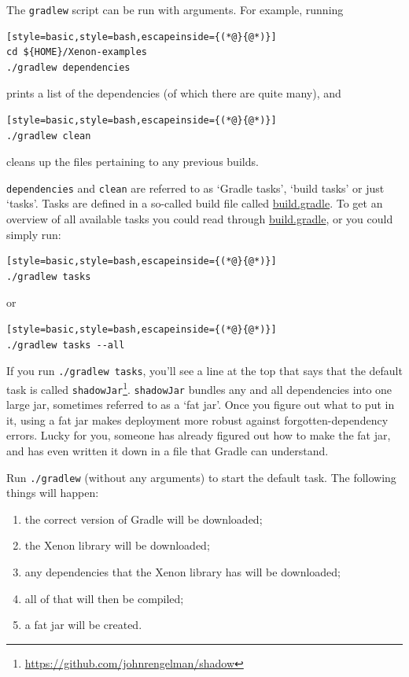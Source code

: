 \documentclass[12pt, a4paper, twoside, openany, titlepage]{book}
\begin{document}
The \texttt{gradlew} script can be run with arguments. For example, running
\begin{lstlisting}[style=basic,style=bash,escapeinside={(*@}{@*)}]
cd ${HOME}/Xenon-examples
./gradlew dependencies
\end{lstlisting} %
prints a list of the dependencies (of which there are quite many), and

\begin{lstlisting}[style=basic,style=bash,escapeinside={(*@}{@*)}]
./gradlew clean
\end{lstlisting} %
cleans up the files pertaining to any previous builds.

\texttt{dependencies} and \texttt{clean} are referred to as `Gradle tasks', `build tasks' or just `tasks'. Tasks are defined in a so-called build file called \url{build.gradle}. To get an overview of all available tasks you could read through \url{build.gradle}, or you could simply run:
\begin{lstlisting}[style=basic,style=bash,escapeinside={(*@}{@*)}]
./gradlew tasks
\end{lstlisting} %

or

\begin{lstlisting}[style=basic,style=bash,escapeinside={(*@}{@*)}]
./gradlew tasks --all
\end{lstlisting} %

If you run \texttt{./gradlew tasks}, you'll see a line at the top that says that the default task is called \texttt{shadowJar}\footnote{\url{https://github.com/johnrengelman/shadow}}. \texttt{shadowJar} bundles any and all dependencies into one large jar, sometimes referred to as a `fat jar'. Once you figure out what to put in it, using a fat jar makes deployment more robust against forgotten-dependency errors. Lucky for you, someone has already figured out how to make the fat jar, and has even written it down in a file that Gradle can understand.

Run \texttt{./gradlew} (without any arguments) to start the default task. The following things will happen:
\begin{enumerate}
\item{the correct version of Gradle will be downloaded;}
\item{the Xenon library will be downloaded;}
\item{any dependencies that the Xenon library has will be downloaded;}
\item{all of that will then be compiled;}
\item{a fat jar will be created.}
\end{enumerate}
\end{document}
